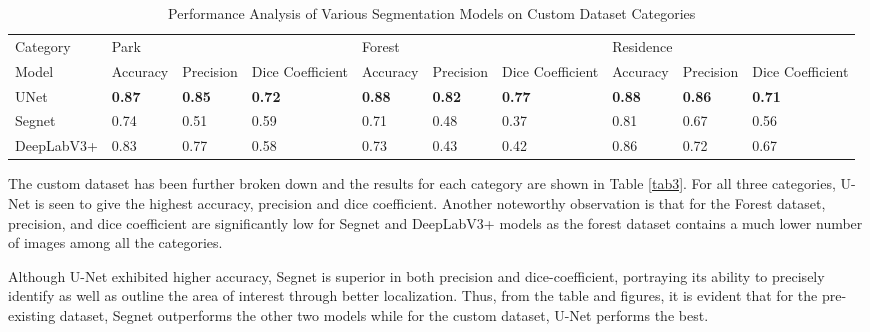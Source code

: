 \begin{table}[!htbp]
\centering
\caption{Performance Analysis of Various Segmentation Models on Custom Dataset Categories}
\label{tab3}
\renewcommand{\arraystretch}{1.5} %
\small %
\begin{tabular}{p{.13\linewidth}p{.07\linewidth}p{.07\linewidth}p{.07\linewidth}p{.07\linewidth}p{.07\linewidth}p{.07\linewidth}p{.07\linewidth}p{.07\linewidth}p{.07\linewidth}}
    \hline
    Category &
    \multicolumn{3}{l}{Park} & \multicolumn{3}{l}{Forest} & \multicolumn{3}{l}{Residence}\\
    \cline{1-10}
    Model & Accuracy & Precision & Dice Coefficient & Accuracy & Precision & Dice Coefficient & Accuracy & Precision & Dice Coefficient\\
    \hline
    UNet    
     & \textbf{0.87}
     & \textbf{0.85}
     & \textbf{0.72}
     & \textbf{0.88}
     & \textbf{0.82}
     & \textbf{0.77}
     & \textbf{0.88}
     & \textbf{0.86}
     & \textbf{0.71}     
\\
Segnet
     & 0.74
     & 0.51
     & 0.59
     & 0.71
     & 0.48
     &  0.37
     & 0.81
     & 0.67
     & 0.56    
\\
DeepLabV3+
     & 0.83
     &  0.77
     & 0.58
     & 0.73
     & 0.43
     & 0.42
     & 0.86
     & 0.72
     & 0.67     
\\
\hline
\end{tabular}

\label{table3}
\end{table}


The custom dataset has been further broken down and the results for each category are shown in Table \ref{tab3}. For all three categories, U-Net is seen to give the highest accuracy, precision and dice coefficient. Another noteworthy observation is that for the Forest dataset, precision, and dice coefficient are significantly low for Segnet and DeepLabV3+ models as the forest dataset contains a much lower number of images among all the categories. 

Although U-Net exhibited higher accuracy, Segnet is superior in both precision and dice-coefficient, portraying its ability to precisely identify as well as outline the area of interest through better localization. Thus, from the table and figures, it is evident that for the pre-existing dataset, Segnet outperforms the other two models while for the custom dataset, U-Net performs the best.

